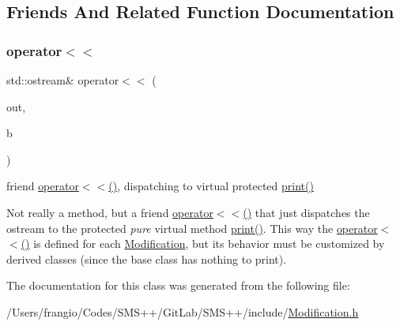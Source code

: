 \subsection{Friends And Related Function Documentation}
\mbox{\label{class_s_m_spp__di__unipi__it_1_1_modification_a293082986307592d7e934c2bb061ffac}} 
\subsubsection{\texorpdfstring{operator$<$$<$}{operator<<}}
{\footnotesize\ttfamily std\+::ostream\& operator$<$$<$ (\begin{DoxyParamCaption}\item[{std\+::ostream \&}]{out,  }\item[{const \mbox{\hyperlink{class_s_m_spp__di__unipi__it_1_1_modification}{Modification}} \&}]{b }\end{DoxyParamCaption})\hspace{0.3cm}{\ttfamily [friend]}}



friend \mbox{\hyperlink{class_s_m_spp__di__unipi__it_1_1_modification_a293082986307592d7e934c2bb061ffac}{operator$<$$<$()}}, dispatching to virtual protected \mbox{\hyperlink{class_s_m_spp__di__unipi__it_1_1_modification_a74372464f55d9c2cfdb603bf030f902f}{print()}} 

Not really a method, but a friend \mbox{\hyperlink{class_s_m_spp__di__unipi__it_1_1_modification_a293082986307592d7e934c2bb061ffac}{operator$<$$<$()}} that just dispatches the ostream to the protected {\itshape pure} virtual method \mbox{\hyperlink{class_s_m_spp__di__unipi__it_1_1_modification_a74372464f55d9c2cfdb603bf030f902f}{print()}}. This way the \mbox{\hyperlink{class_s_m_spp__di__unipi__it_1_1_modification_a293082986307592d7e934c2bb061ffac}{operator$<$$<$()}} is defined for each \mbox{\hyperlink{class_s_m_spp__di__unipi__it_1_1_modification}{Modification}}, but its behavior must be customized by derived classes (since the base class has nothing to print). 

The documentation for this class was generated from the following file\+:\begin{DoxyCompactItemize}
\item 
/\+Users/frangio/\+Codes/\+S\+M\+S++/\+Git\+Lab/\+S\+M\+S++/include/\mbox{\hyperlink{_modification_8h}{Modification.\+h}}\end{DoxyCompactItemize}
